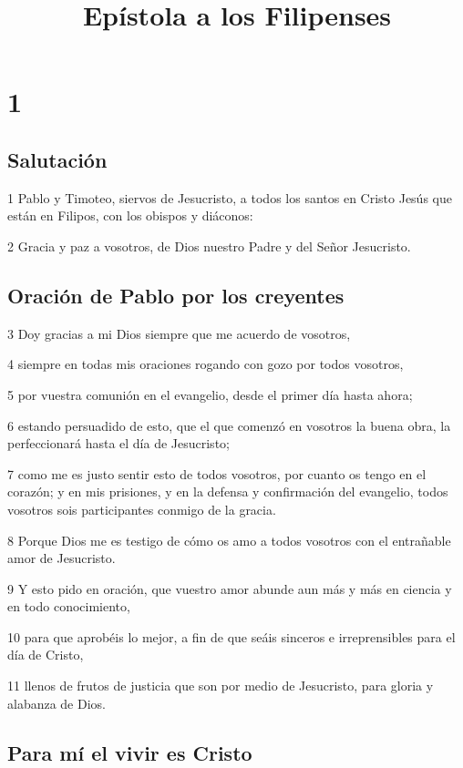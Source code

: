 
\title{Epístola a los Filipenses}

\chapter{1}

\section*{Salutación}

\par 1 Pablo y Timoteo, siervos de Jesucristo, a todos los santos en Cristo Jesús que están en Filipos, con los obispos y diáconos:
\par 2 Gracia y paz a vosotros, de Dios nuestro Padre y del Señor Jesucristo.

\section*{Oración de Pablo por los creyentes}

\par 3 Doy gracias a mi Dios siempre que me acuerdo de vosotros,
\par 4 siempre en todas mis oraciones rogando con gozo por todos vosotros,
\par 5 por vuestra comunión en el evangelio, desde el primer día hasta ahora;
\par 6 estando persuadido de esto, que el que comenzó en vosotros la buena obra, la perfeccionará hasta el día de Jesucristo;
\par 7 como me es justo sentir esto de todos vosotros, por cuanto os tengo en el corazón; y en mis prisiones, y en la defensa y confirmación del evangelio, todos vosotros sois participantes conmigo de la gracia.
\par 8 Porque Dios me es testigo de cómo os amo a todos vosotros con el entrañable amor de Jesucristo.
\par 9 Y esto pido en oración, que vuestro amor abunde aun más y más en ciencia y en todo conocimiento,
\par 10 para que aprobéis lo mejor, a fin de que seáis sinceros e irreprensibles para el día de Cristo,
\par 11 llenos de frutos de justicia que son por medio de Jesucristo, para gloria y alabanza de Dios.

\section*{Para mí el vivir es Cristo}

